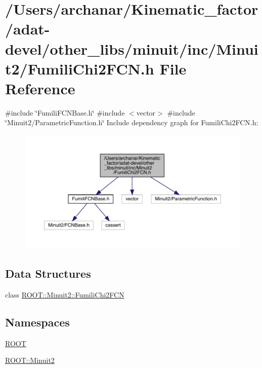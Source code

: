 \hypertarget{adat-devel_2other__libs_2minuit_2inc_2Minuit2_2FumiliChi2FCN_8h}{}\section{/\+Users/archanar/\+Kinematic\+\_\+factor/adat-\/devel/other\+\_\+libs/minuit/inc/\+Minuit2/\+Fumili\+Chi2\+F\+CN.h File Reference}
\label{adat-devel_2other__libs_2minuit_2inc_2Minuit2_2FumiliChi2FCN_8h}
{\ttfamily \#include \char`\"{}Fumili\+F\+C\+N\+Base.\+h\char`\"{}}\newline
{\ttfamily \#include $<$vector$>$}\newline
{\ttfamily \#include \char`\"{}Minuit2/\+Parametric\+Function.\+h\char`\"{}}\newline
Include dependency graph for Fumili\+Chi2\+F\+C\+N.\+h\+:
\nopagebreak
\begin{figure}[H]
\begin{center}
\leavevmode
\includegraphics[width=350pt]{d8/d9d/adat-devel_2other__libs_2minuit_2inc_2Minuit2_2FumiliChi2FCN_8h__incl}
\end{center}
\end{figure}
\subsection*{Data Structures}
\begin{DoxyCompactItemize}
\item 
class \mbox{\hyperlink{classROOT_1_1Minuit2_1_1FumiliChi2FCN}{R\+O\+O\+T\+::\+Minuit2\+::\+Fumili\+Chi2\+F\+CN}}
\end{DoxyCompactItemize}
\subsection*{Namespaces}
\begin{DoxyCompactItemize}
\item 
 \mbox{\hyperlink{namespaceROOT}{R\+O\+OT}}
\item 
 \mbox{\hyperlink{namespaceROOT_1_1Minuit2}{R\+O\+O\+T\+::\+Minuit2}}
\end{DoxyCompactItemize}
